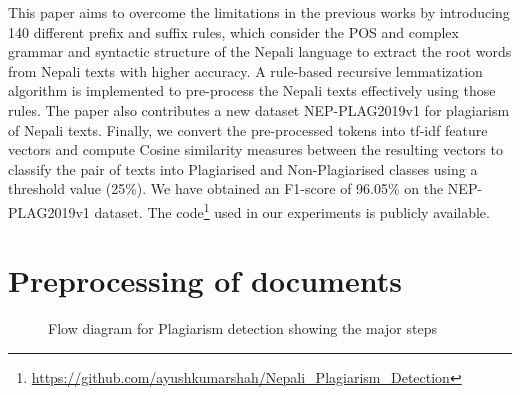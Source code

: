 \documentclass[conference]{IEEEtran}
\begin{document}
This paper aims to overcome the limitations in the previous works by introducing
140 different prefix and suffix rules, which consider the POS and complex
grammar and syntactic structure of the Nepali language to extract the
root words from Nepali texts with higher accuracy. A rule-based recursive
lemmatization algorithm is implemented to pre-process the Nepali texts
effectively using those rules. The paper also contributes a
new dataset NEP-PLAG2019v1 for plagiarism of Nepali texts. Finally, we convert the 
pre-processed tokens into tf-idf feature vectors and compute Cosine similarity measures
between the resulting vectors to classify the pair of texts into Plagiarised and 
Non-Plagiarised classes using a threshold value (25\%). We have obtained an F1-score
of 96.05\% on the NEP-PLAG2019v1 dataset. The
code\footnote{\url{https://github.com/ayushkumarshah/Nepali_Plagiarism_Detection}}
used in our experiments is publicly available.

\section{Preprocessing of documents}
\begin{figure}[htbp]
\caption{Flow diagram for Plagiarism detection showing the major steps} 
\label{flow} 
\end{figure}
\end{document}
